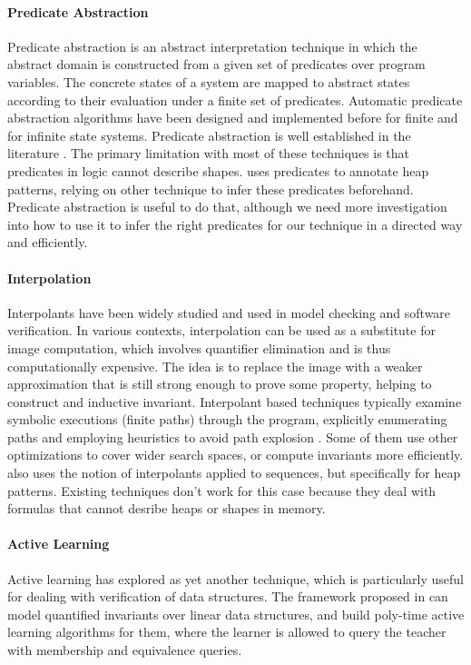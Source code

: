 \paragraph{Predicate Abstraction}
Predicate abstraction is an abstract interpretation technique in which the abstract
domain is constructed from a given set of predicates over program variables. The concrete
states of a system are mapped to abstract states according to their evaluation under a
finite set of predicates. Automatic predicate abstraction algorithms have been designed
and implemented before for finite and for infinite state systems. Predicate abstraction
is well established in the literature \cite{ball01,henzinger02,henzinger04}. The primary
limitation with most of these techniques is that predicates in logic cannot describe
shapes.
\verifier uses predicates to annotate heap patterns, relying on other technique to infer
these predicates beforehand. Predicate abstraction is useful to do that, although we
need more investigation into how to use it to infer the right predicates for our
technique in a directed way and efficiently.

\paragraph{Interpolation}
Interpolants have been widely studied and used in model checking and software
verification. In various contexts, interpolation can be used as a substitute for image
computation, which involves quantifier elimination and is thus computationally
expensive. The idea is to replace the image with a weaker approximation that is still
strong enough to prove some property, helping to construct and inductive invariant.
Interpolant based techniques typically examine symbolic executions (finite paths)
through the program, explicitly enumerating paths and employing heuristics to avoid path
explosion \cite{albarghouthi12,heizmann10,mcmillan06,rummer13}. Some of them use other
optimizations to cover wider search spaces, or compute invariants more efficiently.
\verifier also uses the notion of interpolants applied to sequences, but specifically
for heap patterns. Existing techniques don't work for this case because they deal with
formulas that cannot desribe heaps or shapes in memory.

\paragraph{Active Learning}
Active learning has explored as yet another technique, which is particularly useful for
dealing with verification of data structures. The framework proposed in \cite{garg13}
can model quantified invariants over linear data structures, and build poly-time active
learning algorithms for them, where the learner is allowed to query the teacher with
membership and equivalence queries.

